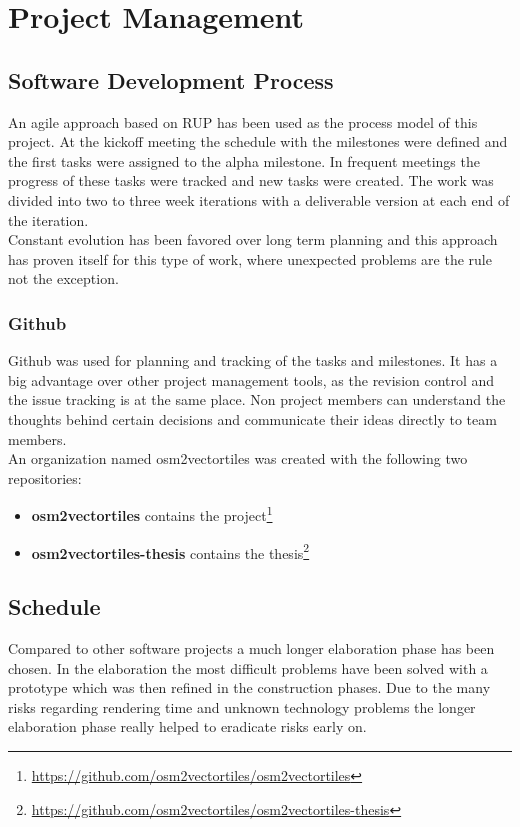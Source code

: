 \chapter{Project Management}\label{project-management}

\section{Software Development Process}

An agile approach based on RUP has been used as the process model of this project. At the kickoff meeting the schedule with the milestones were defined and the first tasks were assigned to the alpha milestone. In frequent meetings the progress of these tasks were tracked and new tasks were created. The work was divided into two to three week iterations with a deliverable version at each end of the iteration.\\
Constant evolution has been favored over long term planning and this approach has proven itself for this type of work, where unexpected problems are the rule not the exception.

\subsection{Github}\label{github}
Github was used for planning and tracking of the tasks and milestones. It has a big advantage over other project management tools, as the revision control and the issue tracking is at the same place. Non project members can understand the thoughts behind certain decisions and communicate their ideas directly to team members.\\
An organization named osm2vectortiles was created with the following two repositories:

\begin{itemize}
\item
  \textbf{osm2vectortiles} contains the project\footnote{\url{https://github.com/osm2vectortiles/osm2vectortiles}}
\item
  \textbf{osm2vectortiles-thesis} contains the thesis\footnote{\url{https://github.com/osm2vectortiles/osm2vectortiles-thesis}}
\end{itemize}

\section{Schedule}

Compared to other software projects a much longer elaboration phase has been chosen. In the elaboration the most difficult problems have been solved with a prototype which was then refined in the construction phases. Due to the many risks regarding rendering time and unknown technology problems the longer elaboration phase really helped to eradicate risks early on.

